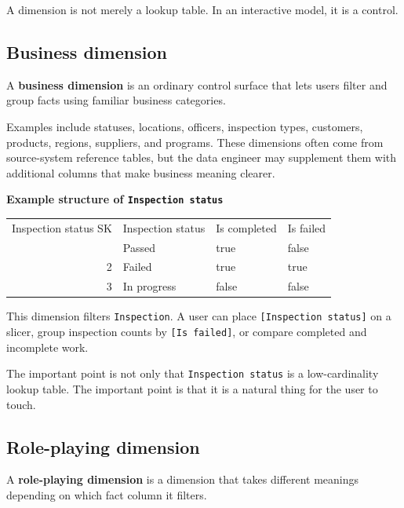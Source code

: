\documentclass[10pt,openany,10pt]{book}
\newcounter{none}
\let\podeToprule\toprule
\let\podeMidrule\midrule
\let\podeBottomrule\bottomrule
\renewcommand{\toprule}{\arrayrulecolor{pbiGrid}\podeToprule}
\renewcommand{\midrule}{\arrayrulecolor{pbiGrid}\podeMidrule}
\renewcommand{\bottomrule}{\arrayrulecolor{pbiGrid}\podeBottomrule}
\begin{document}
A dimension is not merely a lookup table. In an interactive model, it is
a control.

\subsection{Business dimension}\label{business-dimension}

A \textbf{business dimension} is an ordinary control surface that lets
users filter and group facts using familiar business categories.

Examples include statuses, locations, officers, inspection types,
customers, products, regions, suppliers, and programs. These dimensions
often come from source-system reference tables, but the data engineer
may supplement them with additional columns that make business meaning
clearer.

\textbf{Example structure of
\texttt{\textquotesingle{}Inspection\ status\textquotesingle{}}}

{\def\LTcaptype{none} %
\begin{longtable}[]{@{}rlll@{}}
\toprule\noalign{}
Inspection status SK & Inspection status & Is completed & Is failed \\
\midrule\noalign{}
\endhead
\bottomrule\noalign{}
\endlastfoot
1 & Passed & true & false \\
2 & Failed & true & true \\
3 & In progress & false & false \\
\end{longtable}
}

This dimension filters
\texttt{\textquotesingle{}Inspection\textquotesingle{}}. A user can
place \texttt{{[}Inspection\ status{]}} on a slicer, group inspection
counts by \texttt{{[}Is\ failed{]}}, or compare completed and incomplete
work.

The important point is not only that
\texttt{\textquotesingle{}Inspection\ status\textquotesingle{}} is a
low-cardinality lookup table. The important point is that it is a
natural thing for the user to touch.

\subsection{Role-playing dimension}\label{role-playing-dimension}

A \textbf{role-playing dimension} is a dimension that takes different
meanings depending on which fact column it filters.
\end{document}
